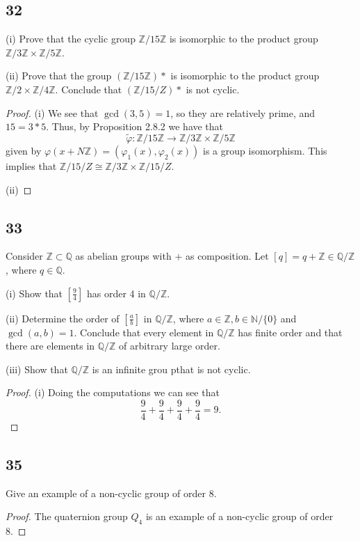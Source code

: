\documentclass{article}
\newcommand{\N}{\mathbb{N}}
\newcommand{\Z}{\mathbb{Z}}
\newcommand{\Q}{\mathbb{Q}}
\newenvironment{hwproof}[1]
{
    #1
    \begin{proof}
}{
    \end{proof}
}
\begin{document}
\subsection*{32}
\begin{hwproof}
    {
        (i) Prove that the cyclic group $\Z / 15\Z$ is isomorphic to the
        product group $\Z / 3\Z \times \Z / 5\Z$.

        (ii) Prove that the group $(\Z / 15\Z)*$ is isomorphic to the product group
        $\Z / 2 \times \Z / 4\Z$. Conclude that $(\Z / 15/Z)*$ is not cyclic.
    }
    (i) We see that $\gcd(3,5) = 1$, so they are relatively prime, and $15=3*5$.
    Thus, by Proposition 2.8.2 we have that
    \begin{equation*}
        \tilde{\varphi}: \Z / 15\Z \to \Z / 3\Z \times \Z / 5\Z
    \end{equation*}
    given by $\varphi(x + N\Z) = (\varphi_1(x), \varphi_2(x))$ is a group isomorphism.
    This implies that $\Z / 15/Z \cong \Z / 3\Z \times \Z / 15/Z$.

    (ii)
\end{hwproof}

\subsection*{33}
\begin{hwproof}
    {
        Consider $\Z \subset \Q$ as abelian groups with $+$ as composition.
        Let $[q] = q + \Z \in \Q / \Z$, where $q \in \Q$.

        (i) Show that $\left[\frac{9}{4}\right]$ has order 4 in $\Q / \Z$.

        (ii) Determine the order of $\left[\frac{a}{b}\right]$ in $\Q / \Z$,
        where $a \in \Z, b \in \N / \{0\}$ and $\gcd(a,b) = 1$. Conclude that
        every element in $\Q / \Z$ has finite order and that there are elements
        in $\Q / \Z$ of arbitrary large order.

        (iii) Show that $\Q / \Z$ is an infinite grou pthat is not cyclic.
    }
    (i) Doing the computations we can see that
    \begin{equation*}
        \frac{9}{4} + \frac{9}{4} + \frac{9}{4} + \frac{9}{4} = 9.
    \end{equation*}


\end{hwproof}

\subsection*{35}
\begin{hwproof}
    {
        Give an example of a non-cyclic group of order 8.
    }
    The quaternion group $Q_4$ is an example of a non-cyclic group of order
    8.
\end{hwproof}
\end{document}
